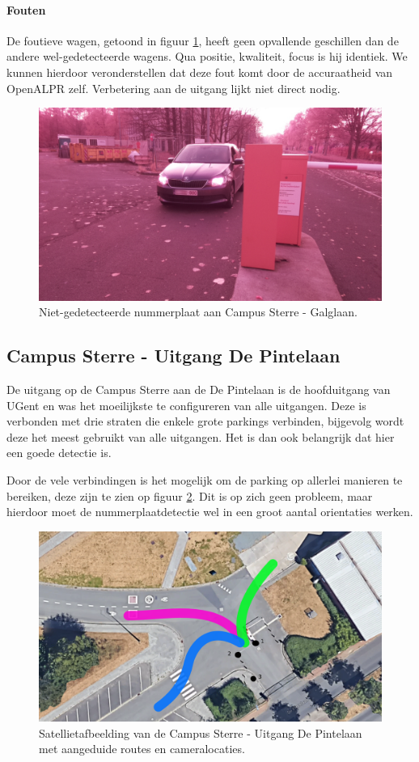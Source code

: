 \paragraph{Fouten}
De foutieve wagen, getoond in figuur \ref{foutiefgalglaan}, heeft geen opvallende geschillen dan de andere wel-gedetecteerde wagens. Qua positie, kwaliteit, focus is hij identiek. We kunnen hierdoor veronderstellen dat deze fout komt door de accuraatheid van OpenALPR zelf. Verbetering aan de uitgang lijkt niet direct nodig.
\begin{figure}[h!]
	\centering
	\includegraphics[width=0.5\linewidth]{img/res-galglaan/galg1.jpg}
	\caption{Niet-gedetecteerde nummerplaat aan Campus Sterre - Galglaan.}
	\label{foutiefgalglaan}
\end{figure}

\subsection{Campus Sterre - Uitgang De Pintelaan}

De uitgang op de Campus Sterre aan de De Pintelaan is de hoofduitgang van UGent en was het moeilijkste te configureren van alle uitgangen. Deze is verbonden met drie straten die enkele grote parkings verbinden, bijgevolg wordt deze het meest gebruikt van alle uitgangen. Het is dan ook belangrijk dat hier een goede detectie is.

Door de vele verbindingen is het mogelijk om de parking op allerlei manieren te bereiken, deze zijn te zien op figuur \ref{fig:satellietdepintelaan}. Dit is op zich geen probleem, maar hierdoor moet de nummerplaatdetectie wel in een groot aantal orientaties werken.

\begin{figure}[h!]
	\centering
	\includegraphics[width=\linewidth]{img/satellietdepintelaan.png}
	\caption{Satellietafbeelding van de Campus Sterre - Uitgang De Pintelaan met aangeduide routes en cameralocaties. \autocite{ugent2019google}}
	\label{fig:satellietdepintelaan}
\end{figure}

